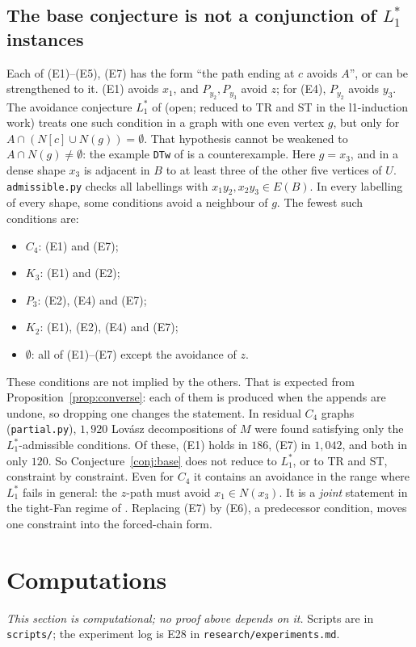 \documentclass[11pt]{amsart}
\theoremstyle{definition}
\begin{document}
\subsection*{The base conjecture is not a conjunction of $L_1^*$ instances}
Each of (E1)--(E5), (E7) has the form ``the path ending at $c$ avoids $A$'', or can be
strengthened to it. (E1) avoids $x_1$, and $P_{y_2},P_{y_3}$ avoid $z$; for (E4), $P_{y_2}$
avoids $y_3$. The avoidance conjecture $L_1^*$ of \cite{L1S} (open; reduced to TR and ST in the
l1-induction work) treats one such condition in a graph with one even vertex $g$, but only for
$A\cap(N[c]\cup N(g))=\emptyset$. That hypothesis cannot be weakened to $A\cap N(g)\ne\emptyset$:
the example \texttt{DTw} of \cite{L1S} is a counterexample. Here $g=x_3$, and in a dense shape
$x_3$ is adjacent in $B$ to at least three of the other five vertices of $U$.
\texttt{admissible.py} checks all labellings with $x_1y_2,x_2y_3\in E(B)$. In every labelling of
every shape, some conditions avoid a neighbour of $g$. The fewest such conditions are:
\begin{itemize}
\item $C_4$: (E1) and (E7);
\item $K_3$: (E1) and (E2);
\item $P_3$: (E2), (E4) and (E7);
\item $K_2$: (E1), (E2), (E4) and (E7);
\item $\emptyset$: all of (E1)--(E7) except the avoidance of $z$.
\end{itemize}
These conditions are not implied by the others. That is expected from
Proposition~\ref{prop:converse}: each of them is produced when the appends are undone, so dropping
one changes the statement. In residual $C_4$ graphs (\texttt{partial.py}),
$1{,}920$ Lov\'asz decompositions of $M$ were found satisfying only the $L_1^*$-admissible
conditions. Of these, (E1) holds in $186$, (E7) in $1{,}042$, and both in only $120$. So
Conjecture~\ref{conj:base} does not reduce to $L_1^*$, or to TR and ST, constraint by
constraint. Even for $C_4$ it contains an avoidance in the range where $L_1^*$ fails in
general: the $z$-path must avoid $x_1\in N(x_3)$. It is a \emph{joint} statement in the
tight-Fan regime of \cite{TF}. Replacing (E7) by (E6), a predecessor condition, moves one
constraint into the forced-chain form.

\section{Computations}\label{sec:comp}
\emph{This section is computational; no proof above depends on it.} Scripts are in
\texttt{scripts/}; the experiment log is E28 in \texttt{research/experiments.md}.
\end{document}
